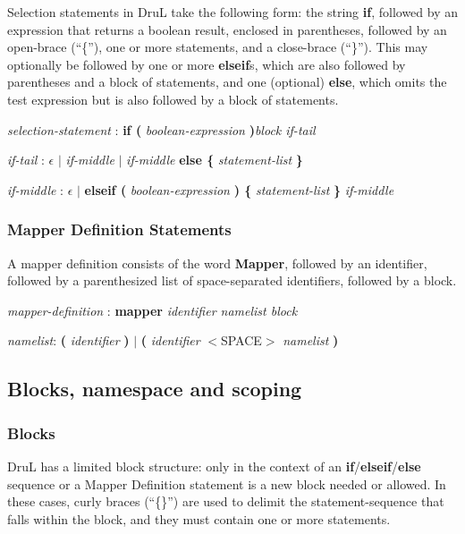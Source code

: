 \documentclass[11pt,twoside]{article}
\begin{document}
Selection statements in DruL take the following form: the string \textbf{if}, followed by an expression that returns a boolean result, enclosed in parentheses, followed by an open-brace (``\{''), one or more statements, and a close-brace (``\}'').  This may optionally be followed by one or more \textbf{elseif}s, which are also followed by parentheses and a block of statements, and one (optional) \textbf{else}, which omits the test expression but is also followed by a block of statements.

\emph{selection-statement} : \textbf{if ( } \emph{boolean-expression} \textbf{ )}\emph{block if-tail}

\emph{if-tail} : $\epsilon$ $|$ \emph{if-middle} $|$
	\emph{if-middle} \textbf{else \{} \emph{statement-list} \textbf{\}} 

\emph{if-middle} : $\epsilon$ $|$   \textbf{elseif ( } \emph{boolean-expression} \textbf{ ) \{} \emph{statement-list} \textbf{\}} \emph{if-middle} 

\subsubsection{Mapper Definition Statements}\label{MapperDefinitionStatement}

A mapper definition consists of the word \textbf{Mapper}, followed by an identifier, followed by a parenthesized list of space-separated identifiers, followed by a block.

\emph{mapper-definition} : \textbf{mapper} \emph{identifier namelist block} 

\emph{namelist}: \textbf ( \emph{identifier} \textbf ) $|$  \textbf ( \emph{identifier} 
$<$SPACE$>$ \emph{namelist} \textbf )


\subsection{Blocks, namespace and scoping}

\subsubsection{Blocks}

DruL has a limited block structure: only in the context of an \textbf{if}/\textbf{elseif}/\textbf{else} sequence or a Mapper Definition statement is a new block needed or allowed.  In these cases, curly braces (``\{\}'') are used to delimit the statement-sequence that falls within the block, and they must contain one or more statements.
\end{document}
